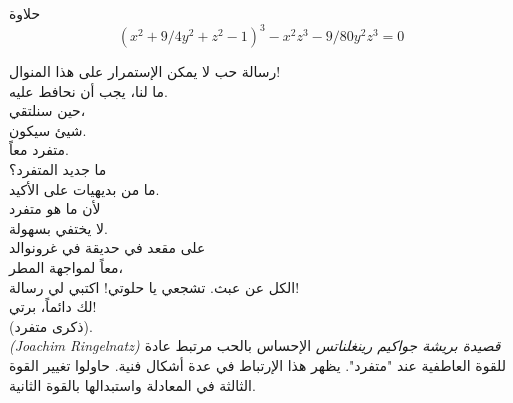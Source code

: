 \begin{surferPage}{حلاوة}
\[(x^2+ 9/4y^2	+ z^2- 1)^3- x^2z^3	- 9/80y^2z^3	= 0\]

\singlespacing
رسالة حب
\singlespacing
لا يمكن الإستمرار على هذا المنوال!\\
ما لنا، يجب أن نحافط عليه.\\
حين سنلتقي،\\
شيئ سيكون.\\
متفرد معاً. \\
ما جديد المتفرد؟\\
ما من بديهيات على الأكيد.\\
لأن ما هو متفرد\\
لا يختفي بسهولة.\\
على مقعد في حديقة في غرونوالد\\
معاً لمواجهة المطر،\\
الكل عن عبث. تشجعي يا حلوتي! اكتبي لي رسالة!\\
لك دائماً، برتي!\\
 (ذكرى متفرد).\\
\textit{\textenglish{(Joachim Ringelnatz)} قصيدة بريشة جواكيم رينغلناتس}
\singlespacing
الإحساس بالحب مرتبط عادة للقوة العاطفية عند "متفرد". يظهر هذا الإرتباط في عدة أشكال فنية.
\singlespacing
حاولوا تغيير القوة الثالثة في المعادلة واستبدالها بالقوة الثانية.
\end{surferPage}
